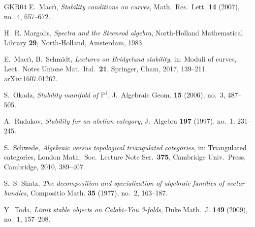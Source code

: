 \documentclass[12pt]{amsart}
\numberwithin{theorem}{section}
\theoremstyle{definition}
\begin{document}
\begin{thebibliography}{GKR04}
		E.~Macr\`\i,
		\emph{Stability conditions on curves},
		Math.\ Res.\ Lett. \textbf{14} (2007), no.~4, 657--672.
		
		H.~R. Margolis,
		\emph{Spectra and the Steenrod algebra},
		North-Holland Mathematical Library \textbf{29}, North-Holland, Amsterdam, 1983.
		
		E.~Macr\`\i, B.~Schmidt,
		\emph{Lectures on Bridgeland stability},
		in: Moduli of curves, Lect.\ Notes Unione Mat.\ Ital.\ \textbf{21}, Springer, Cham, 2017, 139--211.
		arXiv:1607.01262.
		
		S.~Okada,
		\emph{Stability manifold of $\mathbb{P}^1$},
		J.~Algebraic Geom. \textbf{15} (2006), no.~3, 487--505.
		
		A.~Rudakov,
		\emph{Stability for an abelian category},
		J.~Algebra \textbf{197} (1997), no.~1, 231--245.
		
		S.~Schwede,
		\emph{Algebraic versus topological triangulated categories},
		in: Triangulated categories, London Math.\ Soc.\ Lecture Note Ser.\ \textbf{375}, Cambridge Univ.\ Press, Cambridge, 2010, 389--407.
		
		S.~S. Shatz,
		\emph{The decomposition and specialization of algebraic families of vector bundles},
		Compositio Math. \textbf{35} (1977), no.~2, 163--187.
		
		Y.~Toda,
		\emph{Limit stable objects on Calabi--Yau 3-folds},
		Duke Math.\ J. \textbf{149} (2009), no.~1, 157--208.
		
	\end{thebibliography}
\end{document}
